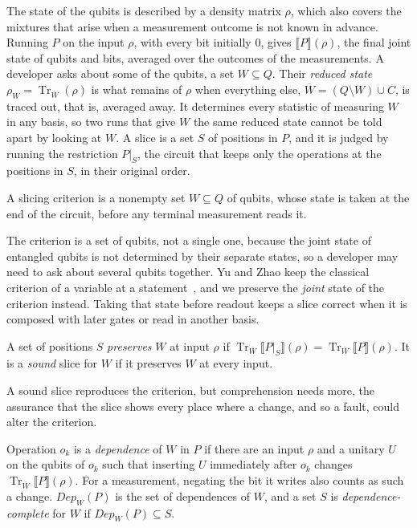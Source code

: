 The state of the qubits is described by a density matrix $\rho$, which also covers the mixtures that arise when a
measurement outcome is not known in advance. Running $P$ on the input $\rho$, with every bit initially $0$, gives
$\llbracket P \rrbracket(\rho)$, the final joint state of qubits and bits, averaged over the outcomes of the
measurements. A developer asks about some of the qubits, a set $W \subseteq Q$. Their \emph{reduced state}
$\rho_W = \operatorname{Tr}_{\overline{W}}(\rho)$ is what remains of $\rho$ when everything else,
$\overline{W} = (Q \setminus W) \cup C$, is traced out, that is, averaged away. It determines every statistic of
measuring $W$ in any basis, so two runs that give $W$ the same reduced state cannot be told apart by looking at
$W$. A slice is a set $S$ of positions in $P$, and it is judged by running the restriction $P|_S$, the circuit that
keeps only the operations at the positions in $S$, in their original order.

\begin{definition}\label{def:criterion}
A slicing criterion is a nonempty set $W \subseteq Q$ of qubits, whose state is taken at the end of the circuit,
before any terminal measurement reads it.
\end{definition}

The criterion is a set of qubits, not a single one, because the joint state of entangled qubits is not determined
by their separate states, so a developer may need to ask about several qubits together. Yu and Zhao keep the
classical criterion of a variable at a statement~\cite{yu2025qpdg}, and we preserve the \emph{joint} state of the
criterion instead. Taking that state before readout keeps a slice correct
when it is composed with later gates or read in another basis.

\begin{definition}[Soundness]\label{def:sound}
A set of positions $S$ \emph{preserves} $W$ at input $\rho$ if $\operatorname{Tr}_{\overline{W}}
\llbracket P|_S \rrbracket(\rho) = \operatorname{Tr}_{\overline{W}}\llbracket P \rrbracket(\rho)$. It is a
\emph{sound} slice for $W$ if it preserves $W$ at every input.
\end{definition}

A sound slice reproduces the criterion, but comprehension needs more, the assurance that the slice shows every
place where a change, and so a fault, could alter the criterion.

\begin{definition}[Dependence]\label{def:dep}
Operation $o_k$ is a \emph{dependence} of $W$ in $P$ if there are an input $\rho$ and a unitary $U$ on the qubits
of $o_k$ such that inserting $U$ immediately after $o_k$ changes $\operatorname{Tr}_{\overline{W}}\llbracket P
\rrbracket(\rho)$. For a measurement, negating the bit it writes also counts as such a change. $\mathit{Dep}_W(P)$
is the set of dependences of $W$, and a set $S$ is \emph{dependence-complete} for $W$ if $\mathit{Dep}_W(P)
\subseteq S$.
\end{definition}

